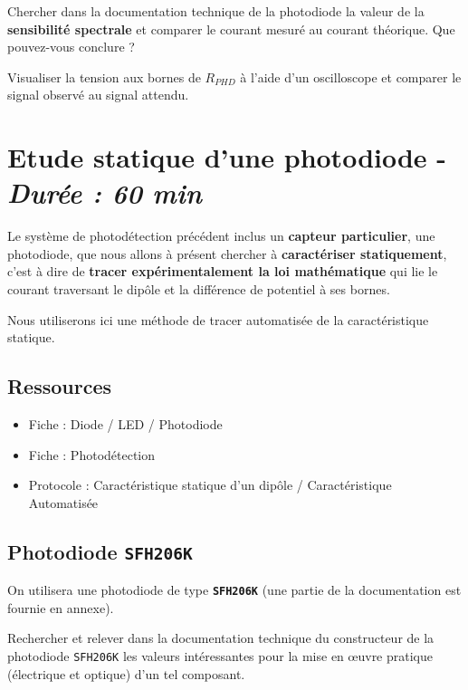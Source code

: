 \Quest Chercher dans la documentation technique de la photodiode la valeur de la \textbf{sensibilité spectrale} et comparer le courant mesuré au courant théorique. Que pouvez-vous conclure ?

\Manip Visualiser la tension aux bornes de $R_{PHD}$ à l'aide d'un oscilloscope et comparer le signal observé au signal attendu. 


\clearpage
\section{Etude statique d'une photodiode - \textit{Durée : 60 min}}

Le système de photodétection précédent inclus un \textbf{capteur particulier}, une photodiode, que nous allons à présent chercher à \textbf{caractériser statiquement}, c'est à dire de \textbf{tracer expérimentalement la loi mathématique} qui lie le courant traversant le dipôle et la différence de potentiel à ses bornes.

Nous utiliserons ici une méthode de tracer automatisée de la caractéristique statique.


\subsection{Ressources}

\begin{itemize}
	\item Fiche : Diode / LED / Photodiode
	\item Fiche : Photodétection
	\item Protocole : Caractéristique statique d'un dipôle / Caractéristique Automatisée
\end{itemize}


\subsection{Photodiode \texttt{SFH206K}}

On utilisera une photodiode de type \textbf{\texttt{SFH206K}} (une partie de la documentation est fournie en annexe).

\Quest Rechercher et relever dans la documentation technique du constructeur de la photodiode \texttt{SFH206K} les valeurs intéressantes pour la mise en \oe{}uvre pratique (électrique et optique) d'un tel composant.


